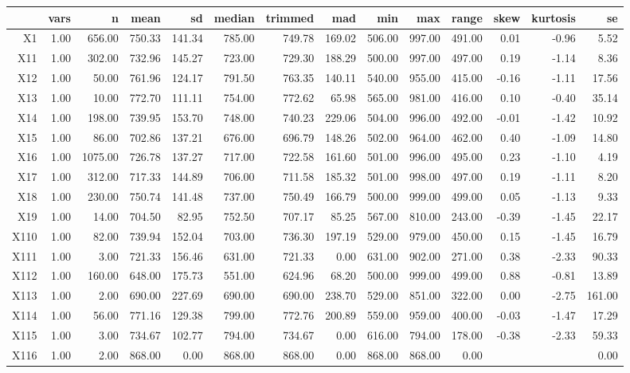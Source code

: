 % 
\begin{tabular}{rrrrrrrrrrrrrr}
  \hline
 & vars & n & mean & sd & median & trimmed & mad & min & max & range & skew & kurtosis & se \\ 
  \hline
X1 & 1.00 & 656.00 & 750.33 & 141.34 & 785.00 & 749.78 & 169.02 & 506.00 & 997.00 & 491.00 & 0.01 & -0.96 & 5.52 \\ 
  X11 & 1.00 & 302.00 & 732.96 & 145.27 & 723.00 & 729.30 & 188.29 & 500.00 & 997.00 & 497.00 & 0.19 & -1.14 & 8.36 \\ 
  X12 & 1.00 & 50.00 & 761.96 & 124.17 & 791.50 & 763.35 & 140.11 & 540.00 & 955.00 & 415.00 & -0.16 & -1.11 & 17.56 \\ 
  X13 & 1.00 & 10.00 & 772.70 & 111.11 & 754.00 & 772.62 & 65.98 & 565.00 & 981.00 & 416.00 & 0.10 & -0.40 & 35.14 \\ 
  X14 & 1.00 & 198.00 & 739.95 & 153.70 & 748.00 & 740.23 & 229.06 & 504.00 & 996.00 & 492.00 & -0.01 & -1.42 & 10.92 \\ 
  X15 & 1.00 & 86.00 & 702.86 & 137.21 & 676.00 & 696.79 & 148.26 & 502.00 & 964.00 & 462.00 & 0.40 & -1.09 & 14.80 \\ 
  X16 & 1.00 & 1075.00 & 726.78 & 137.27 & 717.00 & 722.58 & 161.60 & 501.00 & 996.00 & 495.00 & 0.23 & -1.10 & 4.19 \\ 
  X17 & 1.00 & 312.00 & 717.33 & 144.89 & 706.00 & 711.58 & 185.32 & 501.00 & 998.00 & 497.00 & 0.19 & -1.11 & 8.20 \\ 
  X18 & 1.00 & 230.00 & 750.74 & 141.48 & 737.00 & 750.49 & 166.79 & 500.00 & 999.00 & 499.00 & 0.05 & -1.13 & 9.33 \\ 
  X19 & 1.00 & 14.00 & 704.50 & 82.95 & 752.50 & 707.17 & 85.25 & 567.00 & 810.00 & 243.00 & -0.39 & -1.45 & 22.17 \\ 
  X110 & 1.00 & 82.00 & 739.94 & 152.04 & 703.00 & 736.30 & 197.19 & 529.00 & 979.00 & 450.00 & 0.15 & -1.45 & 16.79 \\ 
  X111 & 1.00 & 3.00 & 721.33 & 156.46 & 631.00 & 721.33 & 0.00 & 631.00 & 902.00 & 271.00 & 0.38 & -2.33 & 90.33 \\ 
  X112 & 1.00 & 160.00 & 648.00 & 175.73 & 551.00 & 624.96 & 68.20 & 500.00 & 999.00 & 499.00 & 0.88 & -0.81 & 13.89 \\ 
  X113 & 1.00 & 2.00 & 690.00 & 227.69 & 690.00 & 690.00 & 238.70 & 529.00 & 851.00 & 322.00 & 0.00 & -2.75 & 161.00 \\ 
  X114 & 1.00 & 56.00 & 771.16 & 129.38 & 799.00 & 772.76 & 200.89 & 559.00 & 959.00 & 400.00 & -0.03 & -1.47 & 17.29 \\ 
  X115 & 1.00 & 3.00 & 734.67 & 102.77 & 794.00 & 734.67 & 0.00 & 616.00 & 794.00 & 178.00 & -0.38 & -2.33 & 59.33 \\ 
  X116 & 1.00 & 2.00 & 868.00 & 0.00 & 868.00 & 868.00 & 0.00 & 868.00 & 868.00 & 0.00 &  &  & 0.00 \\ 
   \hline
\end{tabular}

